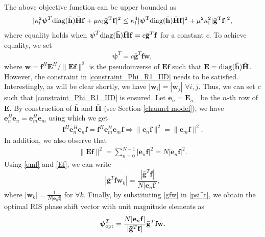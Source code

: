 \documentclass[journal,draftclsnofoot,onecolumn,12pt]{IEEEtran}
\begin{document}
The above objective function can be upper bounded as
\begin{align*}
     |\kappa_l^2 \boldsymbol{\psi}^T\rm{diag}(\bar{\mathbf{h}}) \bar{\mathbf{H}} \mathbf{f} +\mu \kappa_l \bar{\mathbf{g}}^T \mathbf{f}|^2 \leq  \kappa_l^4 |\boldsymbol{\psi}^T{\rm diag}(\mathbf{\bar{h}}) \bar{\mathbf{H}} \mathbf{f}|^2 +\mu^2 \kappa_l^2 |\bar{\mathbf{g}}^T\mathbf{f}|^2,
\end{align*}
where equality holds when $\boldsymbol{\psi}^T{\rm diag}(\mathbf{\bar{h}})\bar{\mathbf{H}}\mathbf{f} = c  \bar{\mathbf{g}}^T\mathbf{f}$ for a constant $c$. To achieve  equality, we set 
\begin{align}
 \boldsymbol{\psi}^T=c  \bar{\mathbf{g}}^T\mathbf{f} \mathbf{w},\label{psi^t} 
\end{align}
where $\mathbf{w}=\mathbf{f}^H\mathbf{E}^H/\|\mathbf{Ef}\|^2$ is the pseudoinverse of $\mathbf{Ef}$ such that $\mathbf{E}={\rm diag}(\mathbf{\bar{h}})\mathbf{\Bar{H}}$. However, the constraint in \eqref{constraint_Phi_R1_IID} needs to be satisfied. Interestingly, as  will be clear shortly, we have $|\mathbf{w}_i|=|\mathbf{w}_j|$ $\forall i,j$. Thus, we can set $c$ such that  \eqref{constraint_Phi_R1_IID} is ensured. 
Let $\mathbf{e}_n=\mathbf{E}_{n,:}$ be the $n$-th row of $\mathbf{E}$.
By  construction of $\bar{\mathbf{h}}$ and $\bar{\mathbf{H}}$ (see Section \ref{channel model}), we have $\mathbf{e}_n^H\mathbf{e}_n=\mathbf{e}_m^H\mathbf{e}_m$ using which we get
 \begin{align}
 \mathbf{f}^H\mathbf{e}_n^H\mathbf{e}_n\mathbf{f}=\mathbf{f}^H\mathbf{e}_m^H\mathbf{e}_m\mathbf{f} \Rightarrow \|\mathbf{e}_n\mathbf{f}\|^2=\|\mathbf{e}_m\mathbf{f}\|^2.\label{emf}
 \end{align}
 In addition, we also observe that 
\begin{align}
  \|\mathbf{E}\mathbf{f}\|^2=\sum\nolimits_{n=0}^{N-1}|\mathbf{e}_n\mathbf{f}|^2=N|\mathbf{e}_n\mathbf{f}|^2.\label{Ef}
\end{align}
Using \eqref{emf} and \eqref{Ef}, we can write 
\begin{equation}|\bar{\mathbf{g}}^T\mathbf{f}\mathbf{w}_k|=\frac{|\bar{\mathbf{g}}^T\mathbf{f}|}{N|\mathbf{e}_n\mathbf{f}|},\label{gfw}
\end{equation}
where $|\mathbf{w}_k|=\frac{1}{N|\mathbf{e}_n\mathbf{f}|}$ for $\forall k$. 
Finally, by substituting \eqref{gfw} in \eqref{psi^t}, we obtain the optimal RIS phase shift vector with unit magnitude elements as
  \begin{align}
      {\boldsymbol{\psi}}_{\rm opt}^T=\frac{N|\mathbf{e}_n\mathbf{f}|}{|\mathbf{\bar{g}}^T\mathbf{f}|}\mathbf{\bar{g}}^T\mathbf{f}\mathbf{w}\label{OptSol_Phi_R1_IID}.
  \end{align}
\end{document}
